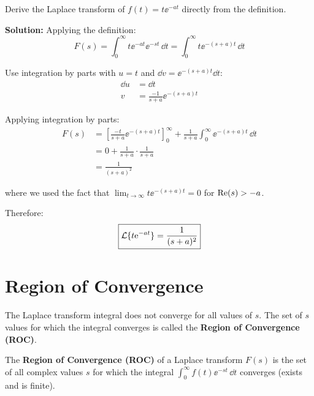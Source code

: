 \begin{examplebox}[title=Example: Deriving the Laplace Transform of $t\ee^{-at}$ from Definition]
Derive the Laplace transform of $f(t) = t\ee^{-at}$ directly from the definition.

\textbf{Solution:}
Applying the definition:
\begin{equation}
F(s) = \int_0^\infty t\ee^{-at}\ee^{-st} \, \dd t = \int_0^\infty t\ee^{-(s+a)t} \, \dd t
\end{equation}

Use integration by parts with $u = t$ and $\dd v = \ee^{-(s+a)t} \dd t$:
\begin{align}
\dd u &= \dd t \\
v &= \frac{-1}{s+a}\ee^{-(s+a)t}
\end{align}

Applying integration by parts:
\begin{align}
F(s) &= \left[ \frac{-t}{s+a}\ee^{-(s+a)t} \right]_0^\infty + \frac{1}{s+a}\int_0^\infty \ee^{-(s+a)t} \, \dd t \\
&= 0 + \frac{1}{s+a} \cdot \frac{1}{s+a} \\
&= \frac{1}{(s+a)^2}
\end{align}

where we used the fact that $\lim_{t\to\infty} t\ee^{-(s+a)t} = 0$ for $\operatorname{Re}(s) > -a$.

Therefore:
\begin{equation}
\boxed{\mathcal{L}\{t\mathrm{e}^{-at}\} = \frac{1}{(s+a)^2}}
\end{equation}
\end{examplebox}

\section{Region of Convergence}

The Laplace transform integral does not converge for all values of $s$. The set of $s$ values for which the integral converges is called the \textbf{Region of Convergence (ROC)}.

\begin{definitionbox}[title=Definition: Region of Convergence]
The \textbf{Region of Convergence (ROC)} of a Laplace transform $F(s)$ is the set of all complex values $s$ for which the integral $\int_0^\infty f(t)\ee^{-st} \, \dd t$ converges (exists and is finite).
\end{definitionbox}



